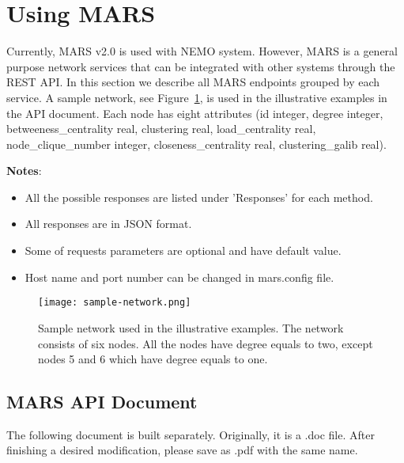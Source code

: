 \section{Using MARS}
Currently, MARS v2.0 is used with NEMO system. However, MARS is a general purpose network services that can be integrated with other systems through the REST API. In this section we describe all MARS endpoints grouped by each service. 
A sample network, see Figure~\ref{fig:sample-network}, is used in the illustrative examples in the API document. Each node has eight attributes (id integer, degree integer, betweeness\_centrality real, clustering real, load\_centrality real, node\_clique\_number integer, closeness\_centrality real, clustering\_galib real).


\noindent \textbf{Notes}:
\begin{itemize}
\item All the possible responses are listed under 'Responses' for each method. 
\item All responses are in JSON format.
\item Some of requests parameters are optional and have default value.
\item Host name and port number can be changed in mars.config file. 
\end{itemize}



\begin{figure}[H]
\centering
\texttt{[image: sample-network.png]}
\caption{
Sample network used in the illustrative examples. The network consists of six nodes. All the nodes have degree equals to two, except nodes 5 and 6 which have degree equals to one.
}     

 
\label{fig:sample-network}
\end{figure}
\subsection{MARS API Document}
The following document is built separately. Originally, it is a .doc file. After finishing a desired modification, please save as .pdf with the same name.
